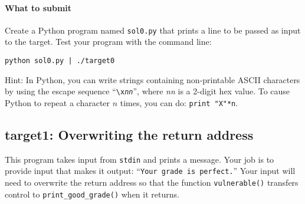 \documentclass[letterpaper,12pt]{report}
\begin{document}
{\paragraph{What to submit}
Create a Python program named \texttt{sol0.py} that prints a line to be passed as input to the target.  Test your program with the command line:

\smallskip

\quad\texttt{python sol0.py | ./target0}

\medskip

Hint: In Python, you can write strings containing non-printable ASCII characters by using the escape sequence ``\texttt{\textbackslash x\emph{nn}}'', where \emph{nn} is a 2-digit hex value.  To cause Python to repeat a character $n$ times, you can do: \texttt{print "X"*n}.

\subsection*{target1: Overwriting the return address}
\label{sec:target1}

This program takes input from \texttt{stdin} and prints a message.  Your job is to provide input that makes it output: ``\texttt{Your grade is perfect.}''  Your input will need to overwrite the return address so that the function \texttt{vulnerable()} transfers control to \texttt{print\_good\_grade()} when it returns.

}
\end{document}
